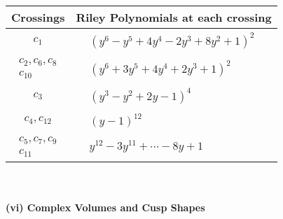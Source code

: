 \documentclass[1p]{elsarticle_modified}
\theoremstyle{definition}
\begin{document}
\begin{tabular}{m{50pt}|m{274pt}}
Crossings & \hspace{64pt}Riley Polynomials at each crossing \\
\hline $$\begin{aligned}c_{1}\end{aligned}$$&$\begin{aligned}
&(y^6- y^5+4 y^4-2 y^3+8 y^2+1)^2
\end{aligned}$\\
\hline $$\begin{aligned}c_{2},c_{6},c_{8}\\c_{10}\end{aligned}$$&$\begin{aligned}
&(y^6+3 y^5+4 y^4+2 y^3+1)^2
\end{aligned}$\\
\hline $$\begin{aligned}c_{3}\end{aligned}$$&$\begin{aligned}
&(y^3- y^2+2 y-1)^4
\end{aligned}$\\
\hline $$\begin{aligned}c_{4},c_{12}\end{aligned}$$&$\begin{aligned}
&(y-1)^{12}
\end{aligned}$\\
\hline $$\begin{aligned}c_{5},c_{7},c_{9}\\c_{11}\end{aligned}$$&$\begin{aligned}
&y^{12}-3 y^{11}+\cdots-8 y+1
\end{aligned}$\\
\hline
\end{tabular}\\~\\
\newpage\flushleft \textbf{(vi) Complex Volumes and Cusp Shapes}
\end{document}
